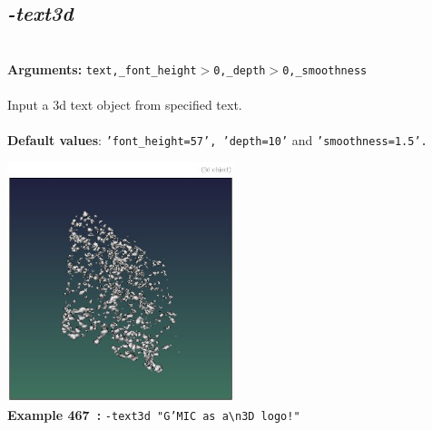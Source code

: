 \documentclass[a4paper,11pt,twoside]{book}
\begin{document}
\subsection{\emph{-text3d} }\vspace*{-0.5em}
~\\\textbf{Arguments: } 
{\small \texttt{text,\_font\_height$>$0,\_depth$>$0,\_smoothness}}\\~\\
Input a 3d text object from specified text.
~\\~\\\textbf{Default values}: {\small \texttt{'font\_height=57', 'depth=10'} and \texttt{'smoothness=1.5'.}}
\begin{center}\includegraphics[keepaspectratio=true,height=7cm,width=\textwidth]{img/gmic_def467.jpg}\\
{\footnotesize \textbf{Example 467~:} \texttt{-text3d "G'MIC as a\textbackslash n3D logo!"}}
\end{center}
\end{document}
